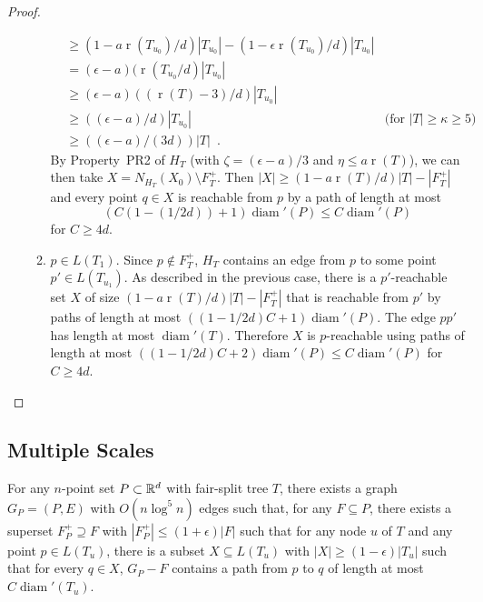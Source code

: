 \documentclass{patmorin}
\DeclareMathOperator{\rank}{r}
\DeclareMathOperator{\diam}{diam}
\begin{document}
\begin{proof}
\begin{enumerate}
\begin{enumerate}
\begin{align*}
	      & \ge (1-a\rank(T_{u_0})/d)|T_{u_0}|-(1-\epsilon\rank(T_{u_0})/d)|T_{u_0}| \\
	      & = (\epsilon-a)(\rank(T_{u_0}/d)|T_{u_0}| \\
	      & \ge (\epsilon-a)((\rank(T)-3)/d)|T_{u_0}| \\
	      & \ge ((\epsilon-a)/d)|T_{u_0}| 
		& \text{(for $|T|\ge \kappa \ge 5$)} \\
	      & \ge ((\epsilon-a)/(3d))|T| \enspace .
\end{align*}
		    By Property~PR2 of $H_T$ (with $\zeta = (\epsilon-a)/3$ and $\eta \le a\rank(T)$), we can then take $X=N_{H_T}(X_0)\setminus F^+_T$.  Then $|X| \ge (1-a\rank(T)/d)|T|-|F^+_T|$ and every point $q\in X$ is reachable from $p$ by a path of length at most
		    \[ (C(1-(1/2d))+1)\diam'(P) \le C\diam'(P) \]
	     for $C\ge 4d$.

	    \item $p\in L(T_1)$. Since $p\not\in F^+_T$, $H_T$ contains an
	    edge from $p$ to some point $p'\in L(T_{u_1})$.  As described
	    in the previous case, there is a $p'$-reachable set $X$ of
	    size $(1-a\rank(T)/d)|T|-|F^+_T|$ that is reachable from $p'$
	    by paths of length at most $((1-1/2d)C+1)\diam'(P)$.
	    The edge $pp'$ has length at most
	    $\diam'(T)$. Therefore $X$ is $p$-reachable using
	    paths of length at most $((1-1/2d)C+2)\diam'(P)
	    \le C\diam'(P)$ for $C\ge 4d$.
    \end{enumerate}
  \end{enumerate}
\end{proof}

\subsection{Multiple Scales}

\begin{lem}
  For any $n$-point set $P\subset\mathbb{R}^d$ with fair-split tree $T$, there
  exists a graph $G_P=(P,E)$ with $O(n\log^5 n)$ edges such that, 
  for any $F\subseteq P$, there
  exists a superset $F^+_P\supseteq F$ with $|F^+_P|\le
  (1+\epsilon)|F|$ such that for any node $u$ of $T$ and any point
	$p\in L(T_u)$, there is a subset $X\subseteq L(T_u)$ with $|X|\ge (1-\epsilon)|T_u|$ such that
  for every $q\in X$, $G_P-F$ contains a path from $p$ to $q$
  of length at most $C\diam'(T_u)$.
\end{lem}
\end{document}
